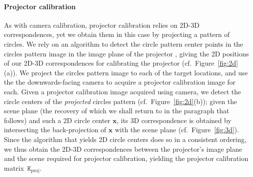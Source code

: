 \documentclass[review]{elsarticle}
\begin{document}
\paragraph{Projector calibration} As with camera calibration, projector calibration relies on 2D-3D correspondences, yet we obtain them in this case by projecting a pattern of circles. We rely on an algorithm to detect the circle pattern center points in the circles pattern image in the image plane of the projector \cite{bradski2000opencv}, giving the 2D positions of our 2D-3D correspondences for calibrating the projector (cf.\ Figure~\ref{fig:2d}(a)). We project the circles pattern image to each of the target locations, and use the the downwards-facing camera to acquire a projector calibration image for each. Given a projector calibration image acquired using camera, we detect the circle centers of the \textit{projected} circles pattern (cf.\ Figure~\ref{fig:2d}(b)); given the scene plane (the recovery of which we shall return to in the paragraph that follows) and such a 2D circle center $\mathbf{x}$, its 3D correspondence is obtained by intersecting the back-projection of $\mathbf{x}$ with the scene plane (cf.\ Figure~\ref{fig:3d}). Since the algorithm that yields 2D circle centers does so in a consistent ordering, we thus obtain the 2D-3D correspondences between the projector's image plane and the scene required for projector calibration, yielding the projector calibration matrix~$\mathtt{K}_\text{proj}$.
\end{document}
